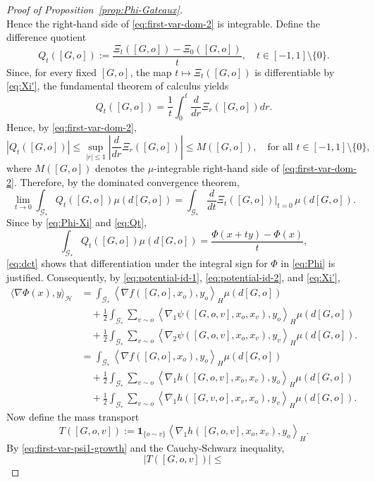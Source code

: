 \documentclass[11pt]{article}
\newcommand{\be}{\begin{equation}}
\newcommand{\ee}{\end{equation}}
\numberwithin{equation}{section}
\begin{document}
\begin{proof}[Proof of Proposition~\ref{prop:Phi-Gateaux}]
\[\]
Hence the right-hand side of \eqref{eq:first-var-dom-2} is integrable. 
Define the difference quotient
\be\label{eq:Qt}
Q_t([G,o])
:=
\frac{\Xi_t([G,o])-\Xi_0([G,o])}{t},
\quad t \in [-1,1] \setminus \{0\}.
\ee
Since, for every fixed \([G,o]\), the map \(t\mapsto \Xi_t([G,o])\) is differentiable by \eqref{eq:Xi'}, the fundamental theorem of calculus yields
\[
Q_t([G,o])
=
\frac{1}{t}\int_0^t \frac{d}{dr}\Xi_{r}([G,o])dr.
\]
Hence, by \eqref{eq:first-var-dom-2}, 
\[
|Q_t([G,o])|
\le
\sup_{|r|\le 1}\left|\frac{d}{dr}\Xi_r([G,o])\right|
\le
M([G,o]),
\quad \textrm{for all } t \in [-1,1] \setminus \{0\},
\]
where \(M([G,o])\) denotes the $\mu$-integrable right-hand side of \eqref{eq:first-var-dom-2}. 
Therefore, by the dominated convergence theorem,
\be\label{eq:dct}
\lim_{t\to 0}
\int_{\mathcal G_\ast} Q_t([G,o])\mu(d[G,o])
=
\int_{\mathcal G_\ast}
\frac{d}{dt}\Xi_t([G,o])\bigg|_{t=0}\,
\mu(d[G,o]).
\ee
Since by \eqref{eq:Phi-Xi} and \eqref{eq:Qt},
\[
\int_{\mathcal G_\ast} Q_t([G,o])\mu(d[G,o])
=
\frac{\Phi(x+ty)-\Phi(x)}{t},
\]
\eqref{eq:dct} shows that differentiation under the integral sign for $\Phi$ in \eqref{eq:Phi} is justified. Consequently, by \eqref{eq:potential-id-1}, \eqref{eq:potential-id-2}, and \eqref{eq:Xi'},
\be\begin{aligned}
\langle \nabla\Phi(x),y\rangle_\mathcal{H}
&=
\int_{\mathcal G_\ast}
\left\langle \nabla f([G,o],x_o),{y}_o\right\rangle_H
\mu(d[G,o])
 \\
&\quad
+
\frac12
\int_{\mathcal G_\ast}
\sum_{v\sim o}
\left\langle \nabla_1\psi([G,o,v],x_o,x_v),{y}_o\right\rangle_H
\mu(d[G,o])
 \\
&\quad
+
\frac12
\int_{\mathcal G_\ast}
\sum_{v\sim o}
\left\langle \nabla_2\psi([G,o,v],x_o,x_v),{y}_v\right\rangle_H
\mu(d[G,o]).
\\
&=
\int_{\mathcal G_\ast}
\left\langle \nabla f([G,o],x_o),{y}_o\right\rangle_H
\mu(d[G,o])
 \\
&\quad
+
\frac12
\int_{\mathcal G_\ast}
\sum_{v\sim o}
\left\langle \nabla_1 h([G,o,v],x_o,x_v),{y}_o\right\rangle_H
\mu(d[G,o])
 \\
&\quad
+
\frac12
\int_{\mathcal G_\ast}
\sum_{v\sim o}
\left\langle \nabla_1 h([G,v,o],x_v,x_o),{y}_v\right\rangle_H
\mu(d[G,o]).
\label{eq:proof-first-var-2}
\end{aligned}\ee
Now define the mass transport
\be\label{eq:T}
T([G,o,v])
:=
\mathbf 1_{\{o\sim v\}}
\left\langle \nabla_1 h([G,o,v],x_o,x_v),{y}_o\right\rangle_H.
\ee
By \eqref{eq:first-var-psi1-growth} and the Cauchy-Schwarz inequality,
\[
|T([G,o,v])|
\le
\]
\end{proof}
\end{document}
